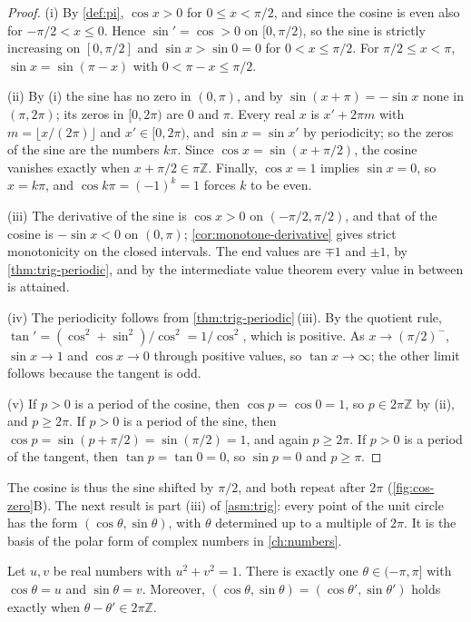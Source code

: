 \begin{proof}
(i) By \cref{def:pi}, $\cos x>0$ for $0\le x<\pi/2$, and since the cosine is even also for $-\pi/2<x\le0$. Hence $\sin'=\cos>0$ on $[0,\pi/2)$, so the sine is strictly increasing on $[0,\pi/2]$ and $\sin x>\sin0=0$ for $0<x\le\pi/2$. For $\pi/2\le x<\pi$, $\sin x=\sin(\pi-x)$ with $0<\pi-x\le\pi/2$.

(ii) By (i) the sine has no zero in $(0,\pi)$, and by $\sin(x+\pi)=-\sin x$ none in $(\pi,2\pi)$; its zeros in $[0,2\pi)$ are $0$ and $\pi$. Every real $x$ is $x'+2\pi m$ with $m=\lfloor x/(2\pi)\rfloor$ and $x'\in[0,2\pi)$, and $\sin x=\sin x'$ by periodicity; so the zeros of the sine are the numbers $k\pi$. Since $\cos x=\sin(x+\pi/2)$, the cosine vanishes exactly when $x+\pi/2\in\pi\mathbb Z$. Finally, $\cos x=1$ implies $\sin x=0$, so $x=k\pi$, and $\cos k\pi=(-1)^k=1$ forces $k$ to be even.

(iii) The derivative of the sine is $\cos x>0$ on $(-\pi/2,\pi/2)$, and that of the cosine is $-\sin x<0$ on $(0,\pi)$; \cref{cor:monotone-derivative} gives strict monotonicity on the closed intervals. The end values are $\mp1$ and $\pm1$, by \cref{thm:trig-periodic}, and by the intermediate value theorem every value in between is attained.

(iv) The periodicity follows from \cref{thm:trig-periodic}\,(iii). By the quotient rule, $\tan'=(\cos^2+\sin^2)/\cos^2=1/\cos^2$, which is positive. As $x\to(\pi/2)^-$, $\sin x\to1$ and $\cos x\to0$ through positive values, so $\tan x\to\infty$; the other limit follows because the tangent is odd.

(v) If $p>0$ is a period of the cosine, then $\cos p=\cos0=1$, so $p\in2\pi\mathbb Z$ by (ii), and $p\ge2\pi$. If $p>0$ is a period of the sine, then $\cos p=\sin(p+\pi/2)=\sin(\pi/2)=1$, and again $p\ge2\pi$. If $p>0$ is a period of the tangent, then $\tan p=\tan0=0$, so $\sin p=0$ and $p\ge\pi$.
\end{proof}

The cosine is thus the sine shifted by $\pi/2$, and both repeat after $2\pi$ (\cref{fig:cos-zero}B). The next result is part (iii) of \cref{asm:trig}: every point of the unit circle has the form $(\cos\theta,\sin\theta)$, with $\theta$ determined up to a multiple of $2\pi$. It is the basis of the polar form of complex numbers in \cref{ch:numbers}.

\begin{proposition}
\label{prop:circle-points}
Let $u,v$ be real numbers with $u^2+v^2=1$. There is exactly one $\theta\in(-\pi,\pi]$ with $\cos\theta=u$ and $\sin\theta=v$. Moreover, $(\cos\theta,\sin\theta)=(\cos\theta',\sin\theta')$ holds exactly when $\theta-\theta'\in2\pi\mathbb Z$.
\end{proposition}


